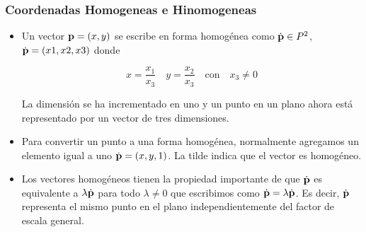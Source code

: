 \begin{frame}
    \frametitle{Coordenadas Homogeneas e Hinomogeneas}
    
    \begin{itemize}
        \item Un vector $\boldsymbol{\mathbf{p}} = (x, y)$ se escribe en forma homogénea como $\dot{\boldsymbol{\mathbf{p}}} \in P^2$, $\dot{\boldsymbol{\mathbf{p}}} = (x1, x2, x3)$ donde
        
       \begin{equation*}
            x = \dfrac{x_1}{x_3} \quad y= \dfrac{x_2}{x_3} \quad \text{con} \quad x_3 \neq 0
       \end{equation*}
        
        La dimensión se ha incrementado en uno y un punto en un plano ahora está representado por un vector de tres dimensiones.
        \item Para convertir un punto a una forma homogénea, normalmente agregamos un elemento igual a uno $\dot{\boldsymbol{\mathbf{p}}} = (x, y, 1)$. La tilde indica que el vector es homogéneo.
        \item Los vectores homogéneos tienen la propiedad importante de que $\dot{\boldsymbol{\mathbf{p}}}$ es equivalente a $\lambda \dot{\boldsymbol{\mathbf{p}}}$ para todo $\lambda \neq 0$ que escribimos como $\dot{\boldsymbol{\mathbf{p}}} = \lambda \dot{\boldsymbol{\mathbf{p}}}$. Es decir, $\dot{\boldsymbol{\mathbf{p}}}$ representa el mismo punto en el plano independientemente del factor de escala general.
    \end{itemize}

    
\end{frame}




